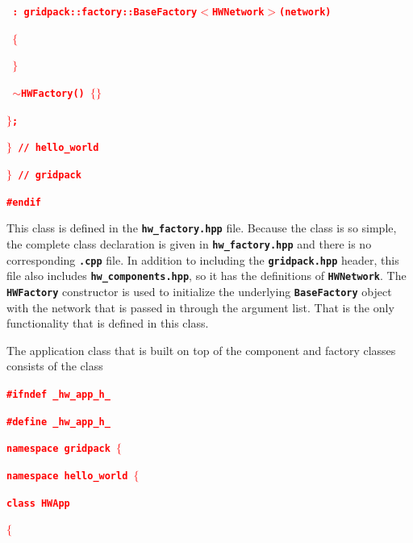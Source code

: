 \documentclass[12pt]{report} %
\begin{document}
\textcolor{red}{\texttt{\textbf{      : gridpack::factory::BaseFactory$\boldsymbol{\mathrm{<}}$HWNetwork$\boldsymbol{\mathrm{>}}$(network)}}}

\textcolor{red}{\texttt{\textbf{    $\boldsymbol{\mathrm{\{}}$}}}

\textcolor{red}{\texttt{\textbf{    $\boldsymbol{\mathrm{\}}}$}}}

\textcolor{red}{\texttt{\textbf{    $\boldsymbol{\mathrm{\sim}}$HWFactory() $\boldsymbol{\mathrm{\{}}$$\boldsymbol{\mathrm{\}}}$}}}

\textcolor{red}{\texttt{\textbf{$\boldsymbol{\mathrm{\}}}$;}}}

\textcolor{red}{\texttt{\textbf{$\boldsymbol{\mathrm{\}}}$ // hello\_world}}}

\textcolor{red}{\texttt{\textbf{$\boldsymbol{\mathrm{\}}}$ // gridpack}}}

\textcolor{red}{\texttt{\textbf{\#endif}}}

This class is defined in the \texttt{\textbf{hw\_factory.hpp}} file. Because the class is so simple, the complete class declaration is given in \texttt{\textbf{hw\_factory.hpp}} and there is no corresponding \texttt{\textbf{.cpp}} file. In addition to including the \texttt{\textbf{gridpack.hpp}} header, this file also includes \texttt{\textbf{hw\_components.hpp}}, so it has the definitions of \texttt{\textbf{HWNetwork}}. The \texttt{\textbf{HWFactory}} constructor is used to initialize the underlying \texttt{\textbf{BaseFactory}} object with the network that is passed in through the argument list. That is the only functionality that is defined in this class.

The application class that is built on top of the component and factory classes consists of the class

\textcolor{red}{\texttt{\textbf{\#ifndef \_hw\_app\_h\_}}}

\textcolor{red}{\texttt{\textbf{\#define \_hw\_app\_h\_}}}

\textcolor{red}{\texttt{\textbf{}}}

\textcolor{red}{\texttt{\textbf{namespace gridpack $\boldsymbol{\mathrm{\{}}$}}}

\textcolor{red}{\texttt{\textbf{namespace hello\_world $\boldsymbol{\mathrm{\{}}$}}}

\textcolor{red}{\texttt{\textbf{}}}

\textcolor{red}{\texttt{\textbf{class HWApp}}}

\textcolor{red}{\texttt{\textbf{$\boldsymbol{\mathrm{\{}}$}}}
\end{document}

